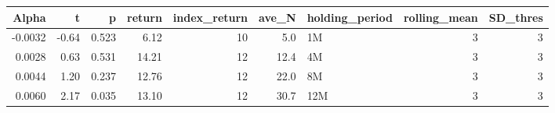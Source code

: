 \begin{table}[ht]
\centering
\begin{tabular}{rrrrrrlrr}
  \hline
Alpha & t & p & return & index\_return & ave\_N & holding\_period & rolling\_mean & SD\_thres \\ 
  \hline
-0.0032 & -0.64 & 0.523 & 6.12 & 10 & 5.0 & 1M &  3 &  3 \\ 
  0.0028 & 0.63 & 0.531 & 14.21 & 12 & 12.4 & 4M &  3 &  3 \\ 
  0.0044 & 1.20 & 0.237 & 12.76 & 12 & 22.0 & 8M &  3 &  3 \\ 
  0.0060 & 2.17 & 0.035 & 13.10 & 12 & 30.7 & 12M &  3 &  3 \\ 
   \hline
\end{tabular}
\end{table}

